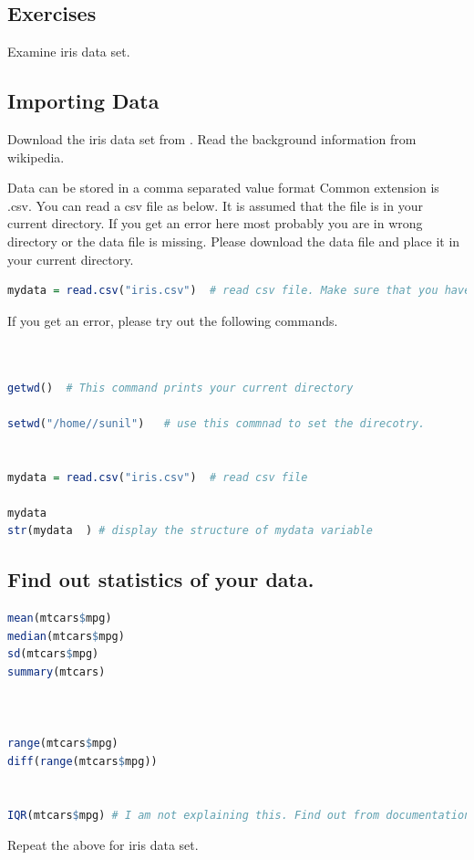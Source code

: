 \documentclass["../Applied_probabillity _and_statistics_lab_KTU.tex"]{subfiles}
\begin{document}
\subsection{Exercises}
  Examine iris data set.
  
\subsection{Importing Data}  
Download the iris data set from . 
Read the background information from wikipedia.

Data can be stored in a comma separated value format Common extension is .csv. You can read a csv file as below. It is assumed that the file is in your current directory. If you get an error here most probably you are in wrong directory or the data file is missing. Please download the data file and place it in your current directory. 

\begin{lstlisting}[language=R]
 mydata = read.csv("iris.csv")  # read csv file. Make sure that you have the csv file
\end{lstlisting}
 If you get an error, please try out the following commands. 
 \begin{lstlisting}[language=R]
 

getwd()  # This command prints your current directory

setwd("/home//sunil")   # use this commnad to set the direcotry.


mydata = read.csv("iris.csv")  # read csv file

mydata
str(mydata  ) # display the structure of mydata variable

\end{lstlisting}
 
\subsection{
Find out statistics of your data.}

\begin{lstlisting}[language=R]
 mean(mtcars$mpg)
median(mtcars$mpg)
sd(mtcars$mpg)
summary(mtcars)



range(mtcars$mpg)
diff(range(mtcars$mpg))


IQR(mtcars$mpg) # I am not explaining this. Find out from documentation.:D
\end{lstlisting}

Repeat the above for iris data set.
\end{document}
